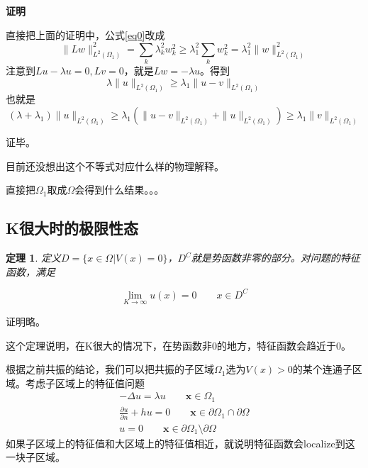 \documentclass[12pt,a4paper]{article}
\newtheorem{theorem}{定理}
\begin{document}
\textbf{证明}

直接把上面的证明中，公式\ref{eq0}改成
\begin{equation}
\|L w\|_{L^2(\Omega_1)}^2 = \sum_k \lambda_k^2 w_k^2 \geq \lambda_1^2 \sum_k w_k^2 = \lambda_1^2 \|w\|_{L^2(\Omega_1)}^2
\end{equation}
注意到$L u - \lambda u = 0, L v = 0$，就是$L w = - \lambda u$。得到
\begin{equation}
\lambda \|u\|_{L^2(\Omega_1)} \geq \lambda_1 \|u - v\|_{L^2(\Omega_1)}
\end{equation}
也就是
\begin{equation}
(\lambda + \lambda_1) \|u\|_{L^2(\Omega_1)} \geq \lambda_1 (\|u - v\|_{L^2(\Omega_1)} + \|u\|_{L^2(\Omega_1)}) \geq \lambda_1 \|v\|_{L^2(\Omega_1)}
\end{equation}

证毕。

目前还没想出这个不等式对应什么样的物理解释。

{\color{gray} 直接把$\Omega_1$取成$\Omega$会得到什么结果。。。}

\subsection{K很大时的极限性态}

\begin{theorem}

定义$D = \{x \in \Omega | V(x) = 0 \}$，$D^C$就是势函数非零的部分。对问题的特征函数，满足

\begin{equation}
\lim_{K \rightarrow \infty} u(x) = 0 \qquad x \in D^C
\end{equation}

\end{theorem}

证明略。

这个定理说明，在K很大的情况下，在势函数非0的地方，特征函数会趋近于0。

根据之前共振的结论，我们可以把共振的子区域$\Omega_1$选为$V(x) > 0$的某个连通子区域。考虑子区域上的特征值问题
\begin{eqnarray}
-\Delta u = \lambda u \qquad \mathbf{x} \in \Omega_1 \\
\frac{\partial u}{\partial n} + h u = 0 \qquad \mathbf{x} \in \partial \Omega_1 \cap \partial \Omega \\
u = 0 \qquad \mathbf{x} \in \partial \Omega_1 \setminus \partial \Omega
\end{eqnarray}
如果子区域上的特征值和大区域上的特征值相近，就说明特征函数会localize到这一块子区域。
\end{document}
